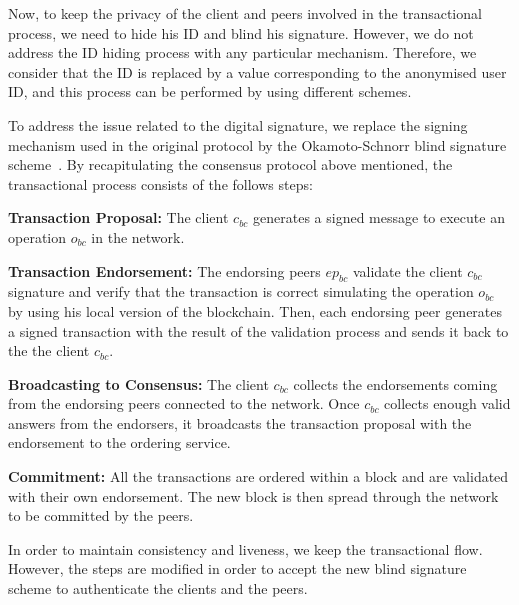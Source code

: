 \documentclass[conference]{llncs}
\begin{document}
Now, to keep the privacy of the client and peers involved in the transactional process, we need to hide his ID and blind his signature. However, we do not address the ID hiding process with any particular mechanism. Therefore, we consider that the ID is replaced by a value corresponding to the anonymised user ID, and this process can be performed by using different schemes.

To address the issue related to the digital signature, we replace the signing mechanism used in the original protocol by the Okamoto-Schnorr blind signature scheme~\cite{okamoto1992provably}. By recapitulating the consensus protocol above mentioned, the transactional process consists of the follows steps:

\begin{compactenum}
    \item \textbf{Transaction Proposal:}  The client $c_{bc}$ generates a signed message to execute an operation $o_{bc}$ in the network.
    \item \textbf{Transaction Endorsement:} The endorsing peers $ep_{bc}$ validate the client $c_{bc}$ signature and verify that the transaction is correct simulating the operation $o_{bc}$ by using his local version of the blockchain. Then, each endorsing peer generates a signed transaction with the result of the validation process and sends it back to the the client $c_{bc}$.
    \item \textbf{Broadcasting to Consensus:} The client $c_{bc}$ collects the endorsements coming from the endorsing peers connected to the network. Once $c_{bc}$ collects enough valid answers from the endorsers, it broadcasts the transaction proposal with the endorsement to the ordering service.
    \item \textbf{Commitment:} All the transactions are ordered within a block and are validated with their own endorsement. The new block is then spread through the network to be committed by the peers.
\end{compactenum}

In order to maintain consistency and liveness, we keep the transactional flow. However, the steps are modified in order to accept the new blind signature scheme to authenticate the clients and the peers.
\end{document}
